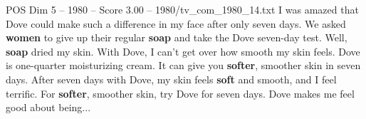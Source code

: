 \begin{textsample}{POS Dim 5 – 1980 – Score 3.00 – 1980/tv\_com\_1980\_14.txt}  \label{ex:f5_pos_001}
I was amazed that Dove could make such a difference in my face after only seven days.
We asked \textbf{women} to give up their regular \textbf{soap} and take the Dove seven-day test.
Well, \textbf{soap} dried my skin.
With Dove, I can't get over how smooth my skin feels.
Dove is one-quarter moisturizing cream.
It can give you \textbf{softer}, smoother skin in seven days.
After seven days with Dove, my skin feels \textbf{soft} and smooth, and I feel terrific.
For \textbf{softer}, smoother skin, try Dove for seven days.
Dove makes me feel good about being...

\end{textsample}
